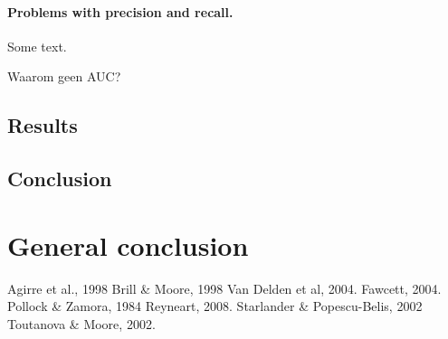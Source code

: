 \documentclass[12pt]{article}
\let\stdsection\section
\renewcommand\section{\newpage\stdsection}
\begin{document}
\paragraph{Problems with precision and recall.} Some text.

Waarom geen AUC?

\subsection{Results}

\subsection{Conclusion}

\section{General conclusion}

\begin{thebibliography}{99}

Agirre et al., 1998
Brill \& Moore, 1998
Van Delden et al, 2004.
Fawcett, 2004.
Pollock \& Zamora, 1984
Reyneart, 2008.
Starlander \& Popescu-Belis, 2002
Toutanova \& Moore, 2002.

\end{thebibliography}

\end{document}
